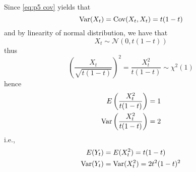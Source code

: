 \begin{subproblem}
        \item
        Since \cref{eq:p5 cov} yields that
        \[\mathrm{Var}(X_t)=\mathrm{Cov}(X_t,X_t)=t(1-t)\]
        and by linearity of normal distribution, we have that
        \[X_t\sim \mathcal N(0,t(1-t))\]
        thus
        \[\left(\frac{X_t}{\sqrt{t(1-t)}}\right)^2
        =\frac{X_t^2}{t(1-t)}\sim\chi^2(1)\]
        hence
        \[\begin{aligned}
            E\left(\frac{X_t^2}{t(1-t)}\right)&=1\\
            \mathrm{Var}\left(\frac{X_t^2}{t(1-t)}\right)&=2\\
        \end{aligned}\]
        i.e.,
        \[\begin{aligned}
            E(Y_t)&=E(X_t^2)=t(1-t)\\
            \mathrm{Var}(Y_t)&=\mathrm{Var}(X_t^2)=2t^2(1-t)^2
        \end{aligned}\]
    \end{subproblem}
    

